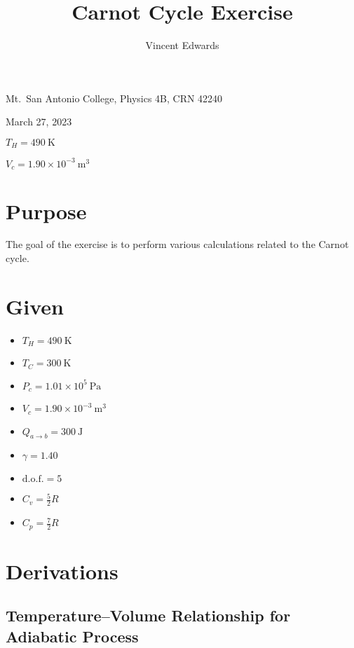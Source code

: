 \documentclass[12pt]{iopart} %
\gdef\sci#1#2{#1 \times 10^{#2}}
\gdef\units#1{~\mathrm{#1}}
\begin{document}
\title{Carnot Cycle Exercise}
\author{Vincent Edwards}
\vspace{10pt}
\begin{indented}
  \item[]Mt.~San Antonio College, Physics 4B, CRN 42240
  \item[]March 27, 2023
  \item[]
  \item[]$T_H = 490~\mathrm{K}$
  \item[]$V_c = \sci{1.90}{-3} \units{m^3}$
\end{indented}
\newpage

\section{Purpose}

The goal of the exercise is to perform various calculations related to the Carnot cycle.

\section{Given}

\begin{itemize}
  \item $T_H = 490 \units{K}$
  \item $T_C = 300 \units{K}$
  \item $P_c = \sci{1.01}{5} \units{Pa}$
  \item $V_c = \sci{1.90}{-3} \units{m^3}$
  \item $Q_{a \to b} = 300 \units{J}$
  \item $\gamma = 1.40$
  \item $\mathrm{d.o.f.} = 5$
  \item $C_v = \frac 5 2 R$
  \item $C_p = \frac 7 2 R$
\end{itemize}

\section{Derivations}

\subsection{Temperature--Volume Relationship for Adiabatic Process}
\end{document}
